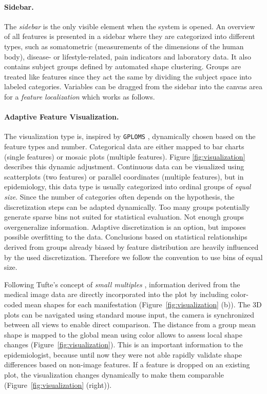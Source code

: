 \documentclass[journal]{style/vgtc} 			          %
\begin{document}
\paragraph{Sidebar.}
The \emph{sidebar} is the only visible element when the system is opened.
%
An overview of all features is presented in a sidebar where they are categorized into different types, such as somatometric (measurements of the dimensions of the human body), disease- or lifestyle-related, pain indicators and laboratory data.
%
It also contains subject groups defined by automated shape clustering.
%
Groups are treated like features since they act the same by dividing the subject space into labeled categories.
%
Variables can be dragged from the sidebar into the canvas area for a \emph{feature localization} which works as follows.
%

\paragraph{Adaptive Feature Visualization.} \label{sec:AdaptiveFeatureVisualization}
The visualization type is, inspired by \texttt{GPLOMS} \cite{Francois2013}, dynamically chosen based on the feature types and number.
%
Categorical data are either mapped to bar charts (single features) or mosaic plots (multiple features).
%
Figure \ref{fig:visualization} describes this dynamic adjustment.
%
Continuous data can be visualized using scatterplots (two features) or parallel coordinates (multiple features), but in epidemiology, this data type is usually categorized into ordinal groups of \emph{equal size}.
%
Since the number of categories often depends on the hypothesis, the discretization steps can be adapted dynamically.
%
Too many groups potentially generate sparse bins not suited for statistical evaluation.
%
Not enough groups overgeneralize information.
%
Adaptive discretization is an option, but imposes possible overfitting to the data.
%
Conclusions based on statistical relationships derived from groups already biased by feature distribution are heavily influenced by the used discretization.
%
Therefore we follow the convention to use bins of equal size.

%
%
Following Tufte's concept of \emph{small multiples} \cite{Tufte1983}, information derived from the medical image data are directly incorporated into the plot by including color-coded mean shapes for each manifestation (Figure~\ref{fig:visualization} (b)).
%
The 3D plots can be navigated using standard mouse input, the camera is synchronized between all views to enable direct comparison.
%
The distance from a group mean shape is mapped to the global mean using color allows to assess local shape changes (Figure~\ref{fig:visualization}).
%
This is an important information to the epidemiologist, because until now they were not able rapidly validate shape differences based on non-image features.
%
If a feature is dropped on an existing plot, the visualization changes dynamically to make them comparable (Figure~\ref{fig:visualization} (right)).
\end{document}
